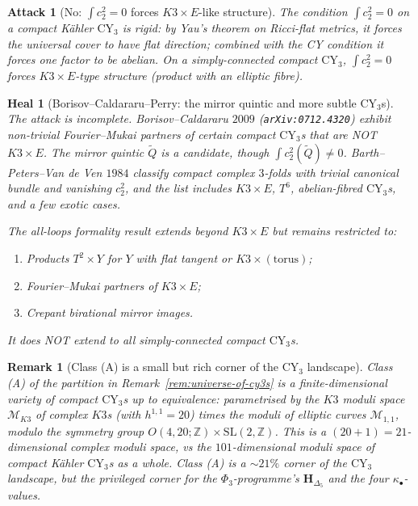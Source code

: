 \documentclass[11pt]{article}
\newtheorem{remark}[theorem]{Remark}
\newtheorem{attack}[theorem]{Attack}
\newtheorem{heal}[theorem]{Heal}
\providecommand{\CY}{\mathrm{CY}}
\providecommand{\ZZ}{\mathbb{Z}}
\begin{document}
\begin{attack}[No: $\int c_2^2 = 0$ forces $K3\times E$-like
structure]
\label{att:c22-zero-forces-k3e}
The condition $\int c_2^2 = 0$ on a compact K\"ahler $\CY_3$ is
rigid: by Yau's theorem on Ricci-flat metrics, it forces the
universal cover to have flat direction;  combined with the CY
condition it forces one factor to be abelian.  On a simply-connected
compact $\CY_3$, $\int c_2^2 = 0$ forces $K3 \times E$-type
structure (product with an elliptic fibre).
\end{attack}

\begin{heal}[Borisov--Caldararu--Perry: the mirror quintic and
more subtle $\CY_3$s]
\label{heal:borisov-caldararu-perry}
The attack is incomplete.  Borisov--Caldararu $2009$
(\texttt{arXiv:0712.4320}) exhibit non-trivial Fourier--Mukai
partners of certain compact $\CY_3$s that are NOT $K3\times E$.
The mirror quintic $\tilde Q$ is a candidate, though $\int c_2^2
(\tilde Q) \neq 0$.  Barth--Peters--Van de Ven $1984$ classify
compact complex $3$-folds with trivial canonical bundle and
vanishing $c_2^2$, and the list includes $K3\times E$, $T^6$,
abelian-fibred $\CY_3$s, and a few exotic cases.

The all-loops formality result extends beyond $K3 \times E$
but remains restricted to:
\begin{enumerate}
\item Products $T^2 \times Y$ for $Y$ with flat tangent or
$K3\times (\text{torus})$;
\item Fourier--Mukai partners of $K3\times E$;
\item Crepant birational mirror images.
\end{enumerate}
It does NOT extend to all simply-connected compact $\CY_3$s.
\end{heal}

\begin{remark}[Class (A) is a small but rich corner of the
$\CY_3$ landscape]
\label{rem:class-a-small}
Class (A) of the partition in Remark~\ref{rem:universe-of-cy3s}
is a finite-dimensional variety of compact $\CY_3$s up to
equivalence:  parametrised by the $K3$ moduli space $\mathcal M_{K3}$
of complex $K3$s (with $h^{1,1} = 20$) times the moduli of
elliptic curves $\mathcal M_{1,1}$, modulo the symmetry group
$O(4,20;\ZZ) \times \mathrm{SL}(2,\ZZ)$.  This is a
$(20 + 1) = 21$-dimensional complex moduli space, vs the
$101$-dimensional moduli space of compact K\"ahler $\CY_3$s as a
whole.  Class (A) is a $\sim 21\%$ corner of the $\CY_3$ landscape,
but the privileged corner for the $\Phi_3$-programme's $\mathbf
H_{\Delta_5}$ and the four $\kappa_\bullet$-values.
\end{remark}
\end{document}
